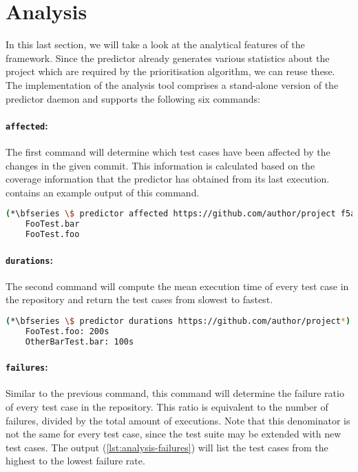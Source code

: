 
\section{Analysis}
In this last section, we will take a look at the analytical features of the framework. Since the predictor already generates various statistics about the project which are required by the prioritisation algorithm, we can reuse these. The implementation of the analysis tool comprises a stand-alone version of the predictor daemon and supports the following six commands:

\paragraph*{\texttt{affected}:} The first command will determine which test cases have been affected by the changes in the given commit. This information is calculated based on the coverage information that the predictor has obtained from its last execution.  contains an example output of this command.

\begin{lstlisting}[language=bash, caption=Example output of the affected-command, label=lst:analysis-affected]
	(*\bfseries \$ predictor affected https://github.com/author/project f5a23e0*)
	FooTest.bar
	FooTest.foo
\end{lstlisting}

\paragraph*{\texttt{durations}:} The second command will compute the mean execution time of every test case in the repository and return the test cases from slowest to fastest.

\begin{lstlisting}[language=bash, caption=Example output of the durations-command, label=lst:analysis-durations]
	(*\bfseries \$ predictor durations https://github.com/author/project*)
	FooTest.foo: 200s
	OtherBarTest.bar: 100s
\end{lstlisting}

\paragraph*{\texttt{failures}:} Similar to the previous command, this command will determine the failure ratio of every test case in the repository. This ratio is equivalent to the number of failures, divided by the total amount of executions. Note that this denominator is not the same for every test case, since the test suite may be extended with new test cases. The output (\cref{lst:analysis-failures}) will list the test cases from the highest to the lowest failure rate.

